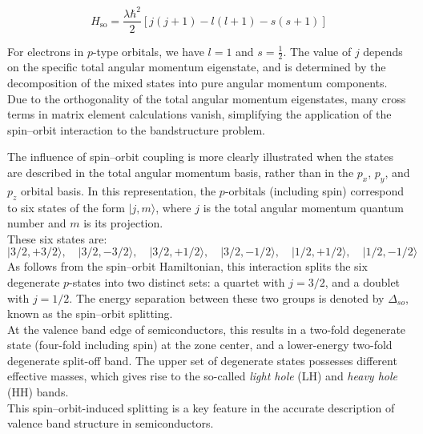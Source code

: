 \begin{equation}
	H_{\text{so}} = \frac{\lambda \hbar^2}{2} \left[ j(j + 1) - l(l + 1) - s(s + 1) \right]
\end{equation}

\noindent
For electrons in \( p \)-type orbitals, we have \( l = 1 \) and \( s = \frac{1}{2} \). The value of \( j \) depends on the specific total angular momentum eigenstate, and is determined by the decomposition of the mixed states into pure angular momentum components.\\
Due to the orthogonality of the total angular momentum eigenstates, many cross terms in matrix element calculations vanish, simplifying the application of the spin–orbit interaction to the bandstructure problem.

The influence of spin–orbit coupling is more clearly illustrated when the states are described in the total angular momentum basis, rather than in the \( p_x \), \( p_y \), and \( p_z \) orbital basis. In this representation, the \( p \)-orbitals (including spin) correspond to six states of the form \( |j, m\rangle \), where \( j \) is the total angular momentum quantum number and \( m \) is its projection.\\
These six states are:
\begin{equation*}
	|3/2, +3/2\rangle, \quad |3/2, -3/2\rangle, \quad |3/2, +1/2\rangle, \quad |3/2, -1/2\rangle, \quad |1/2, +1/2\rangle, \quad |1/2, -1/2\rangle
\end{equation*}
As follows from the spin–orbit Hamiltonian, this interaction splits the six degenerate \( p \)-states into two distinct sets: a quartet with \( j = 3/2 \), and a doublet with \( j = 1/2 \). The energy separation between these two groups is denoted by \( \Delta_{so} \), known as the spin–orbit splitting.\\
At the valence band edge of semiconductors, this results in a two-fold degenerate state (four-fold including spin) at the zone center, and a lower-energy two-fold degenerate split-off band. The upper set of degenerate states possesses different effective masses, which gives rise to the so-called \textit{light hole} (LH) and \textit{heavy hole} (HH) bands.\\
This spin–orbit-induced splitting is a key feature in the accurate description of valence band structure in semiconductors.

